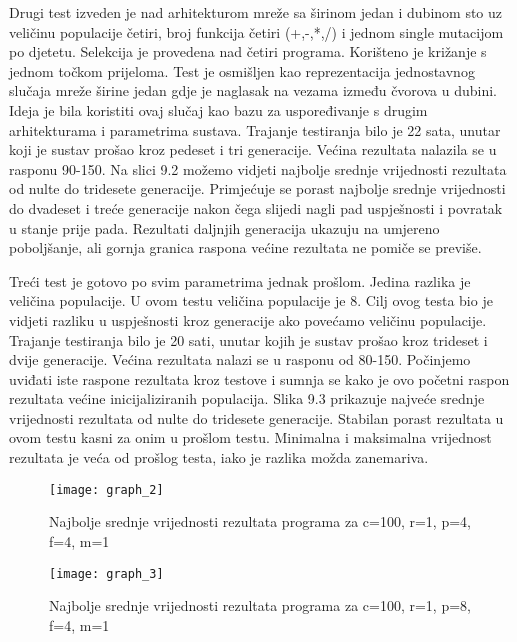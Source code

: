 Drugi test izveden je nad arhitekturom mreže sa širinom jedan i dubinom sto uz veličinu populacije četiri, broj funkcija četiri (+,-,*,/) i jednom single mutacijom po djetetu. Selekcija je provedena nad četiri programa. Korišteno je križanje s jednom točkom prijeloma. Test je osmišljen kao reprezentacija jednostavnog slučaja mreže širine jedan gdje je naglasak na vezama između čvorova u dubini. Ideja je bila koristiti ovaj slučaj kao bazu za uspoređivanje s drugim arhitekturama i parametrima sustava. Trajanje testiranja bilo je 22 sata, unutar koji je sustav prošao kroz pedeset i tri generacije. Većina rezultata nalazila se u rasponu 90-150. Na slici 9.2 možemo vidjeti najbolje srednje vrijednosti rezultata od nulte do tridesete generacije. Primjećuje se porast najbolje srednje vrijednosti do dvadeset i treće generacije nakon čega slijedi nagli pad uspješnosti i povratak u stanje prije pada. Rezultati daljnjih generacija ukazuju na umjereno poboljšanje, ali gornja granica raspona većine rezultata ne pomiče se previše.
\par 
Treći test je gotovo po svim parametrima jednak prošlom. Jedina razlika je veličina populacije. U ovom testu veličina populacije je 8. Cilj ovog testa bio je vidjeti razliku u uspješnosti kroz generacije ako povećamo veličinu populacije. Trajanje testiranja bilo je 20 sati, unutar kojih je sustav prošao kroz trideset i dvije generacije. Većina rezultata nalazi se u rasponu od 80-150. Počinjemo uviđati iste raspone rezultata kroz testove i sumnja se kako je ovo početni raspon rezultata većine inicijaliziranih populacija. Slika 9.3 prikazuje najveće srednje vrijednosti rezultata od nulte do tridesete generacije. Stabilan porast rezultata u ovom testu kasni za onim u prošlom testu. Minimalna i maksimalna vrijednost rezultata je veća od prošlog testa, iako je razlika možda zanemariva.

 \begin{figure}[h]
	\centering
	\texttt{[image: graph\_2]}
	\caption{Najbolje srednje vrijednosti rezultata programa za c=100, r=1, p=4, f=4, m=1}
\end{figure}

 \begin{figure}[h]
	\centering
	\texttt{[image: graph\_3]}
	\caption{Najbolje srednje vrijednosti rezultata programa za c=100, r=1, p=8, f=4, m=1}
\end{figure}

